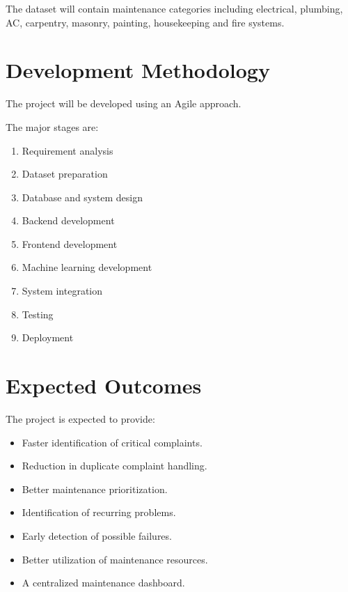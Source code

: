 \documentclass[12pt,a4paper]{article}
\begin{document}
The dataset will contain maintenance categories including electrical, plumbing, AC, carpentry, masonry, painting, housekeeping and fire systems.



\section{Development Methodology}

The project will be developed using an Agile approach.

The major stages are:

\begin{enumerate}
    \item Requirement analysis
    \item Dataset preparation
    \item Database and system design
    \item Backend development
    \item Frontend development
    \item Machine learning development
    \item System integration
    \item Testing
    \item Deployment
\end{enumerate}



\section{Expected Outcomes}

The project is expected to provide:

\begin{itemize}
    \item Faster identification of critical complaints.
    \item Reduction in duplicate complaint handling.
    \item Better maintenance prioritization.
    \item Identification of recurring problems.
    \item Early detection of possible failures.
    \item Better utilization of maintenance resources.
    \item A centralized maintenance dashboard.
\end{itemize}
\end{document}
